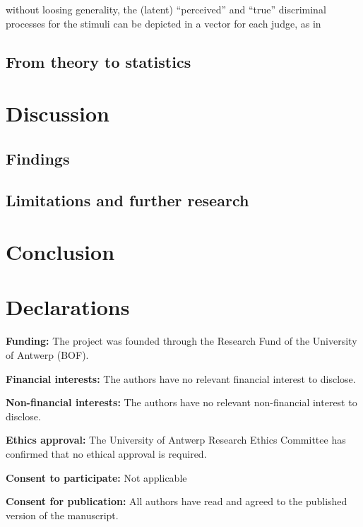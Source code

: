 \documentclass[
  authoryear,
  preprint,
  1p]{elsarticle}
\begin{document}
without loosing generality, the (latent) ``perceived'' and ``true''
discriminal processes for the stimuli can be depicted in a vector for
each judge, as in

\subsection{From theory to statistics}\label{sec-theory-statistics}

\section{Discussion}\label{sec-discuss}

\subsection{Findings}\label{sec-discuss-finding}

\subsection{Limitations and further
research}\label{sec-discuss-limitations}

\section{Conclusion}\label{sec-conclusion}

\newpage{}

\section*{Declarations}\label{declarations}

\textbf{Funding:} The project was founded through the Research Fund of
the University of Antwerp (BOF).

\textbf{Financial interests:} The authors have no relevant financial
interest to disclose.

\textbf{Non-financial interests:} The authors have no relevant
non-financial interest to disclose.

\textbf{Ethics approval:} The University of Antwerp Research Ethics
Committee has confirmed that no ethical approval is required.

\textbf{Consent to participate:} Not applicable

\textbf{Consent for publication:} All authors have read and agreed to
the published version of the manuscript.
\end{document}
